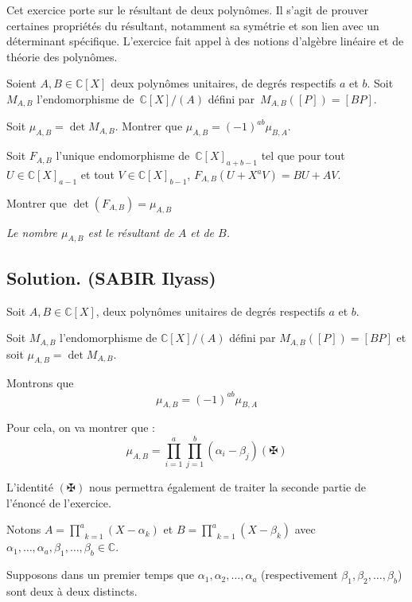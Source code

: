 Cet exercice porte sur le r{\'e}sultant de deux polyn{\^o}mes. Il s'agit de
prouver certaines propri{\'e}t{\'e}s du r{\'e}sultant, notamment sa
sym{\'e}trie et son lien avec un d{\'e}terminant sp{\'e}cifique. L'exercice
fait appel {\`a} des notions d'alg{\`e}bre lin{\'e}aire et de th{\'e}orie des
polyn{\^o}mes.

\begin{exercise}[(R{\'e}sultant)]
Soient $A, B \in \mathbb{C} [X]$ deux polyn{\^o}mes unitaires, de degr{\'e}s
respectifs $a$ et $b$. Soit $M_{A, B}$ l'endomorphisme de~$\mathbb{C} [X] /
(A)$ d{\'e}fini par~$M_{A, B} ([P]) = [BP]$.

Soit $\mu_{A, B} = \det M_{A, B}$. Montrer que $\mu_{A, B} = (- 1)^{ab}
\mu_{B, A}$.

Soit $F_{A, B}$ l'unique endomorphisme de~$\mathbb{C} [X]_{a + b - 1}$ tel que
pour tout $U \in \mathbb{C} [X]_{a - 1}$ et tout $V \in \mathbb{C} [X]_{b -
1}$, $F_{A, B}  (U + X^a V) = BU + AV$.

Montrer que $\det (F_{A, B}) = \mu_{A, B}$

\textit{Le nombre $\mu_{A, B}$ est le r{\'e}sultant de $A$ et de $B$.}
\end{exercise}

\subsection*{Solution. (SABIR Ilyass)}

Soit $A, B \in \mathbb{C} [X]$, deux polyn{\^o}mes unitaires de degr{\'e}s
respectifs $a$ et $b$.

Soit $M_{A, B}$ l'endomorphisme de $\mathbb{C} [X] / (A)$ d{\'e}fini par
$M_{A, B} ([P]) = [BP]$ et soit $\mu_{A, B} = \det M_{A, B}$.

Montrons que
\[ \mu_{A, B} = (- 1)^{ab} \mu_{B, A} \]


Pour cela, on va montrer que :
\[ \mu_{A, B} = \underset{i = 1}{\overset{a}{\prod}} \underset{j =
   1}{\overset{b}{\prod}} (\alpha_i - \beta_j)  (\maltese) \]


L'identit{\'e} $(\maltese)$ nous permettra {\'e}galement de traiter la seconde
partie de l'{\'e}nonc{\'e} de l'exercice.

Notons $A = \underset{k = 1}{\overset{a}{\prod}} (X - \alpha_k)$ et $B =
\underset{k = 1}{\overset{a}{\prod}} (X - \beta_k)$ avec $\alpha_1, \ldots,
\alpha_a, \beta_1, \ldots, \beta_b \in \mathbb{C}$.

Supposons dans un premier temps que $\alpha_1, \alpha_2, \ldots, \alpha_a$
(respectivement $\beta_1, \beta_2, \ldots, \beta_b$) sont deux {\`a} deux
distincts.

